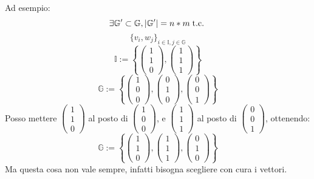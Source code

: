 \documentclass[a4paper,12pt]{article}
\begin{document}
	Ad esempio:
	\[\exists \mathbb{G}^\prime \subset \mathbb{G}, |\mathbb{G}^\prime| = n * m \;\text{t.c.}\; \] 
	\[ \{v_i, w_j\}_{i \in \mathbb{I}, j \in \mathbb{G}}\]
	\[\mathbb{I} := \left\{\begin{pmatrix} 1 \\ 1 \\ 0 \end{pmatrix}, \begin{pmatrix} 1 \\ 1 \\ 1\end{pmatrix}\right\}\]
	\[\mathbb{G} := \left\{\begin{pmatrix} 1 \\ 0 \\ 0 \end{pmatrix}, \begin{pmatrix} 0 \\ 1 \\ 0 \end{pmatrix}, \begin{pmatrix} 0 \\ 0 \\ 1 \end{pmatrix}\right\}\]
	Posso mettere $\begin{pmatrix} 1 \\ 1 \\ 0 \end{pmatrix}$ al posto di $\begin{pmatrix} 1 \\ 0 \\ 0 \end{pmatrix}$, e $\begin{pmatrix} 1 \\ 1 \\ 1 \end{pmatrix}$ al posto di $\begin{pmatrix} 0 \\ 0 \\ 1 \end{pmatrix}$, ottenendo:
	\[\mathbb{G} := \left\{\begin{pmatrix} 1 \\ 1 \\ 0 \end{pmatrix}, \begin{pmatrix} 1 \\ 1 \\ 1\end{pmatrix}, \begin{pmatrix} 0 \\ 1 \\ 0 \end{pmatrix}\right\}\]
	Ma questa cosa non vale sempre, infatti bisogna scegliere con cura i vettori.
	
\end{document}
